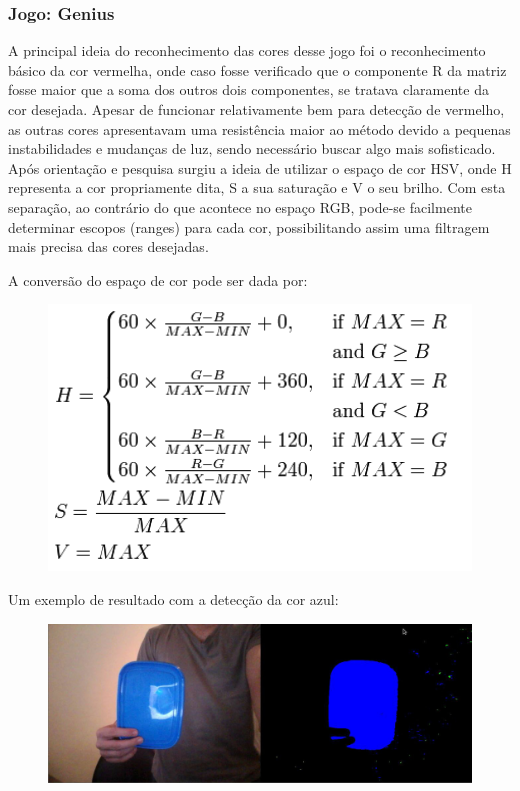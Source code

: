 \documentclass{sciposter}
\begin{document}
\begin{multicols}{3}
\subsubsection*{Jogo: Genius}

A principal ideia do reconhecimento das cores desse jogo foi o reconhecimento básico da cor vermelha, onde caso fosse verificado que o componente R da matriz fosse maior que a soma dos outros dois componentes, se tratava claramente da cor desejada. Apesar de funcionar relativamente bem para detecção de vermelho, as outras cores apresentavam uma resistência maior ao método devido a pequenas instabilidades e mudanças de luz, sendo necessário buscar algo mais sofisticado.
Após orientação e pesquisa surgiu a ideia de utilizar o espaço de cor HSV, onde H representa a cor propriamente dita, S a sua saturação e V o seu brilho. Com esta separação, ao contrário do que acontece no espaço RGB, pode-se facilmente determinar escopos (ranges) para cada cor, possibilitando assim uma filtragem mais precisa das cores desejadas.

A conversão do espaço de cor pode ser dada por:

\begin{figure}[ht]
\centering
\includegraphics[width=8in]{img4.png}
\end{figure}


Um exemplo de resultado com a detecção da cor azul:

\begin{figure}[ht]
\centering
\includegraphics[width=8in]{img2.jpg}
\end{figure}


\end{multicols}
\end{document}
